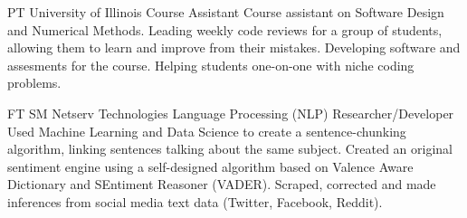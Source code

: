 \documentclass[10pt, oneside, openany]{article} %
\begin{document}
\begin{paracol}{2}
{PT} %
{University of Illinois} %
{Course Assistant} %
{Course assistant on Software Design and Numerical Methods. Leading weekly code reviews for a group of students, allowing them to learn and improve from their mistakes. Developing software and assesments for the course. Helping students one-on-one with niche coding problems.}%

{FT} %
{SM Netserv Technologies} %
{Language Processing (NLP) Researcher/Developer} %
{Used Machine Learning and Data Science to create a sentence-chunking algorithm, linking sentences talking about the same subject. Created an original sentiment engine using a self-designed algorithm based on Valence Aware Dictionary and SEntiment Reasoner (VADER). Scraped, corrected and made inferences from social media text data (Twitter, Facebook, Reddit).}%




\vspace{-\baselineskip}\medskip %

\switchcolumn %



\end{paracol}
\end{document}
